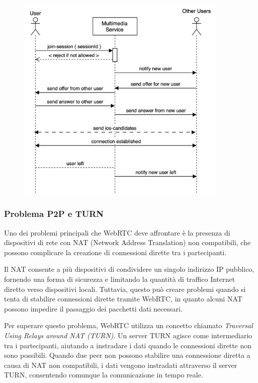 \begin{figure}[H]
    \centering
    \includegraphics[width=0.9\textwidth]{sections/04-implementation/img/piperchat-Multimedia.jpg}
    \label{fig:piperchat-signaling}
\end{figure}

%
%
%
\subsubsection{Problema P2P e TURN}

Uno dei problemi principali che WebRTC deve affrontare è la presenza di dispositivi di rete con NAT (Network Address Translation) non compatibili, che possono complicare la creazione di connessioni dirette tra i partecipanti.

Il NAT consente a più dispositivi di condividere un singolo indirizzo IP pubblico, fornendo una forma di sicurezza e limitando la quantità di traffico Internet diretto verso dispositivi locali. Tuttavia, questo può creare problemi quando si tenta di stabilire connessioni dirette tramite WebRTC, in quanto alcuni NAT possono impedire il passaggio dei pacchetti dati necessari.

Per superare questo problema, WebRTC utilizza un concetto chiamato \textit{Traversal Using Relays around NAT (TURN)}. Un server TURN agisce come intermediario tra i partecipanti, aiutando a instradare i dati quando le connessioni dirette non sono possibili. Quando due peer non possono stabilire una connessione diretta a causa di NAT non compatibili, i dati vengono instradati attraverso il server TURN, consentendo comunque la comunicazione in tempo reale.

